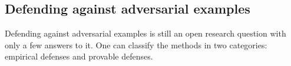 





\subsection{Defending against adversarial examples}

Defending against adversarial examples is still an open research question with only a few answers to it. One can classify the methods in two categories: empirical defenses and provable defenses.

